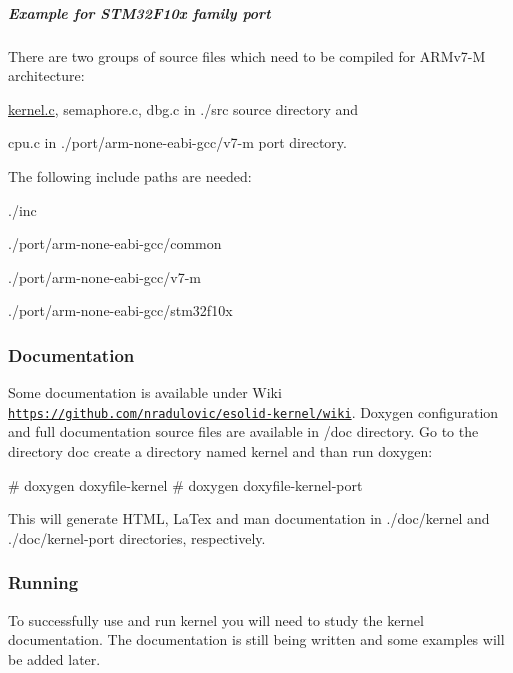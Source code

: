 \subparagraph*{Example for S\-T\-M32\-F10x family port}

There are two groups of source files which need to be compiled for A\-R\-Mv7-\/\-M architecture\-:
\begin{DoxyItemize}
\item \hyperlink{kernel_8c}{kernel.\-c}, semaphore.\-c, dbg.\-c in {\ttfamily ./src} source directory and
\item cpu.\-c in {\ttfamily ./port/arm-\/none-\/eabi-\/gcc/v7-\/m} port directory.
\end{DoxyItemize}

The following include paths are needed\-:
\begin{DoxyItemize}
\item {\ttfamily ./inc}
\item {\ttfamily ./port/arm-\/none-\/eabi-\/gcc/common}
\item {\ttfamily ./port/arm-\/none-\/eabi-\/gcc/v7-\/m}
\item {\ttfamily ./port/arm-\/none-\/eabi-\/gcc/stm32f10x}
\end{DoxyItemize}

\subsubsection*{Documentation}

Some documentation is available under Wiki \href{https://github.com/nradulovic/esolid-kernel/wiki}{\tt https\-://github.\-com/nradulovic/esolid-\/kernel/wiki}. Doxygen configuration and full documentation source files are available in {\ttfamily /doc} directory. Go to the directory {\ttfamily doc} create a directory named {\ttfamily kernel} and than run doxygen\-: \begin{DoxyVerb}# doxygen doxyfile-kernel
# doxygen doxyfile-kernel-port
\end{DoxyVerb}


This will generate H\-T\-M\-L, La\-Tex and man documentation in {\ttfamily ./doc/kernel} and {\ttfamily ./doc/kernel-\/port} directories, respectively.

\subsubsection*{Running}

To successfully use and run kernel you will need to study the kernel documentation. The documentation is still being written and some examples will be added later. 